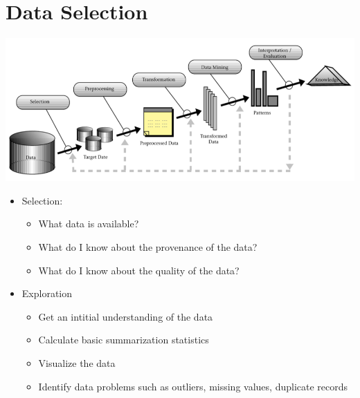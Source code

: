 \chapter{Data Selection}

\includegraphics[width=\textwidth]{images/DM_Process.png}

\begin{itemize}
	\item Selection: 
	\begin{itemize}
		\item What data is available?
		\item What do I know about the provenance of the data?
		\item What do I know about the quality of the data?
	\end{itemize}
	\item Exploration
	\begin{itemize}
		\item Get an intitial understanding of the data
		\item Calculate basic summarization statistics
		\item Visualize the data
		\item Identify data problems such as outliers, missing values, duplicate records
	\end{itemize}
\end{itemize}

